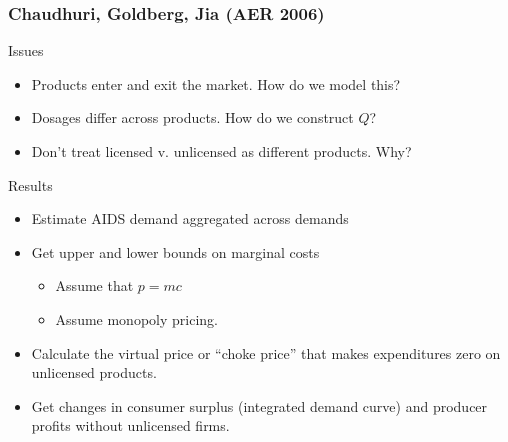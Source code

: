 \documentclass[xcolor=pdftex,dvipsnames,table,mathserif,aspectratio=169]{beamer}
\begin{document}
\begin{frame}
\frametitle{Chaudhuri, Goldberg, Jia (AER 2006)}
Issues
 \begin{itemize}
\item Products enter and exit the market. How do we model this?
\item Dosages differ across products. How do we construct $Q$?
\item Don't treat licensed v. unlicensed as different products. Why?
\end{itemize}
Results
 \begin{itemize}
\item Estimate AIDS demand aggregated across demands
\item Get upper and lower bounds on marginal costs
\begin{itemize}
\item Assume that $p=mc$
\item Assume monopoly pricing.
\end{itemize}
\item Calculate the \alert{virtual price} or ``choke price'' that makes expenditures zero on unlicensed products.
\item Get changes in consumer surplus (integrated demand curve) and producer profits without unlicensed firms.
\end{itemize}
\end{frame}
\end{document}
